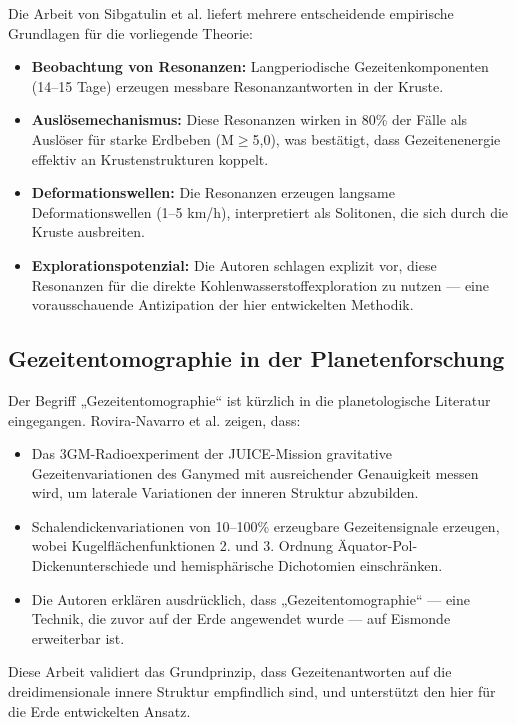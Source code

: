 \documentclass[12pt,a4paper]{article}
\theoremstyle{remark}
\begin{document}
	Die Arbeit von Sibgatulin et al. \cite{Sibgatulin2014} liefert mehrere entscheidende empirische Grundlagen für die vorliegende Theorie:
	
	\begin{itemize}
		\item \textbf{Beobachtung von Resonanzen:} Langperiodische Gezeitenkomponenten (14–15 Tage) erzeugen messbare Resonanzantworten in der Kruste.
		\item \textbf{Auslösemechanismus:} Diese Resonanzen wirken in 80\% der Fälle als Auslöser für starke Erdbeben (M$\ge$5,0), was bestätigt, dass Gezeitenenergie effektiv an Krustenstrukturen koppelt.
		\item \textbf{Deformationswellen:} Die Resonanzen erzeugen langsame Deformationswellen (1–5 km/h), interpretiert als Solitonen, die sich durch die Kruste ausbreiten.
		\item \textbf{Explorationspotenzial:} Die Autoren schlagen explizit vor, diese Resonanzen für die direkte Kohlenwasserstoffexploration zu nutzen — eine vorausschauende Antizipation der hier entwickelten Methodik.
	\end{itemize}
	
	\subsection{Gezeitentomographie in der Planetenforschung}
	
	Der Begriff „Gezeitentomographie“ ist kürzlich in die planetologische Literatur eingegangen. Rovira-Navarro et al. \cite{RoviraNavarro2025} zeigen, dass:
	
	\begin{itemize}
		\item Das 3GM-Radioexperiment der JUICE-Mission gravitative Gezeitenvariationen des Ganymed mit ausreichender Genauigkeit messen wird, um laterale Variationen der inneren Struktur abzubilden.
		\item Schalendickenvariationen von 10–100\% erzeugbare Gezeitensignale erzeugen, wobei Kugelflächenfunktionen 2. und 3. Ordnung Äquator-Pol-Dickenunterschiede und hemisphärische Dichotomien einschränken.
		\item Die Autoren erklären ausdrücklich, dass „Gezeitentomographie“ — eine Technik, die zuvor auf der Erde angewendet wurde — auf Eismonde erweiterbar ist.
	\end{itemize}
	
	Diese Arbeit validiert das Grundprinzip, dass Gezeitenantworten auf die dreidimensionale innere Struktur empfindlich sind, und unterstützt den hier für die Erde entwickelten Ansatz.
	
\end{document}
